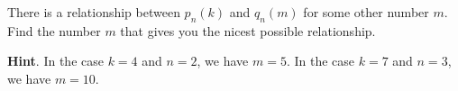\documentclass{book}
\begin{document}
\setcounter{cpjt}{312}
\addtocounter{cpjt}{-1}
\begin{activity}\label{activity-305}
\hypertarget{p-1545}{}%
There is a relationship between \(p_n(k)\) and \(q_n(m)\) for some other number \(m\). Find the number \(m\) that gives you the nicest possible relationship.%
\par\smallskip%
\noindent\textbf{Hint}.\hypertarget{hint-200}{}\quad%
\hypertarget{p-1546}{}%
In the case \(k=4\) and \(n=2\), we have \(m=5\). In the case \(k = 7\) and \(n = 3\), we have \(m = 10\).%
\par\smallskip%
\noindent\end{activity}

\clearpage
\end{document}
